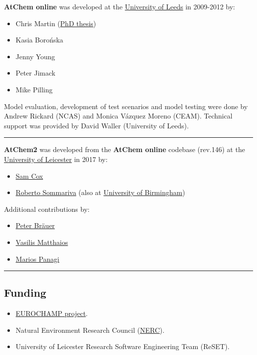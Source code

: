 \textbf{AtChem online} was developed at the
\href{https://www.leeds.ac.uk}{University of Leeds} in 2009-2012 by:

\begin{itemize}
\tightlist
\item
  Chris Martin (\href{http://etheses.whiterose.ac.uk/1596/}{PhD thesis})
\item
  Kasia Borońska
\item
  Jenny Young
\item
  Peter Jimack
\item
  Mike Pilling
\end{itemize}

Model evaluation, development of test scenarios and model testing were
done by Andrew Rickard (NCAS) and Monica Vázquez Moreno (CEAM).
Technical support was provided by David Waller (University of Leeds).

\begin{center}\rule{0.5\linewidth}{\linethickness}\end{center}

\textbf{AtChem2} was developed from the \textbf{AtChem online} codebase
(rev.146) at the \href{https://le.ac.uk}{University of Leicester} in
2017 by:

\begin{itemize}
\tightlist
\item
  \href{https://github.com/spco}{Sam Cox}
\item
  \href{https://github.com/rs028}{Roberto Sommariva} (also at
  \href{https://www.birmingham.ac.uk}{University of Birmingham})
\end{itemize}

Additional contributions by:

\begin{itemize}
\tightlist
\item
  \href{https://github.com/pb866}{Peter Bräuer}
\item
  \href{https://github.com/kailas29}{Vasilis Matthaios}
\item
  \href{https://github.com/mpanagi}{Marios Panagi}
\end{itemize}

\begin{center}\rule{0.5\linewidth}{\linethickness}\end{center}

\hypertarget{funding}{%
\subsection{Funding}\label{funding}}

\begin{itemize}
\tightlist
\item
  \href{https://www.eurochamp.org/}{EUROCHAMP project}.
\item
  Natural Environment Research Council
  (\href{https://www.nerc.ac.uk/}{NERC}).
\item
  University of Leicester Research Software Engineering Team (ReSET).
\end{itemize}
